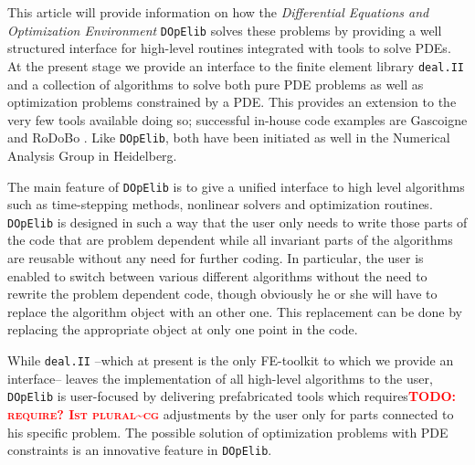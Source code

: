 \documentclass[smallextended]{svjour3}       %
\numberwithin{equation}{section}
\newcommand{\deal}{\texttt{deal.II}}
\newcommand{\dope}{\texttt{DOpElib}}
\newcommand{\todocg}[1]{\textbf{\textsc{\textcolor{red}{TODO: #1\textasciitilde cg}}}}
\begin{document}
This article will provide information on how the {\em Differential 
Equations and Optimization Environment} \dope{}  \cite{dope} 
solves these problems by providing a well structured interface for high-level 
routines integrated
with tools to solve PDEs. At the present stage we provide an interface to 
the finite element library \deal{} and a collection of algorithms to solve
both pure PDE problems as well as optimization problems 
constrained by a PDE. 
This provides an extension to the 
very few tools available doing so; 
successful in-house code examples are Gascoigne \cite{gascoigne}
and RoDoBo \cite{rodobo}. 
Like \dope{}, both have been initiated as well in 
the Numerical Analysis Group in Heidelberg.

The main feature of \dope{} is to give a unified interface to high level 
algorithms such as 
time-stepping methods, nonlinear solvers and optimization routines. 
\dope{} is designed in such a way that the user only needs to write those parts
of the code that are problem dependent while all invariant 
parts of the algorithms
are reusable without any need for further coding.
In particular, the user is enabled to switch between various different 
algorithms without the need to rewrite the problem dependent code, 
though obviously he or she will
have to replace the algorithm object with an other one. 
This replacement can be done by replacing the appropriate object at only
one point in the code.

While \deal{} --which at present is the only FE-toolkit to which we provide an 
interface-- leaves the implementation of all high-level algorithms to the user, 
\dope{} is user-focused by delivering
prefabricated tools which requires\todocg{require? Ist plural} adjustments by the user only for parts
connected to his specific problem. The possible solution of 
optimization problems with PDE constraints is an innovative feature in \dope{}.
\end{document}
